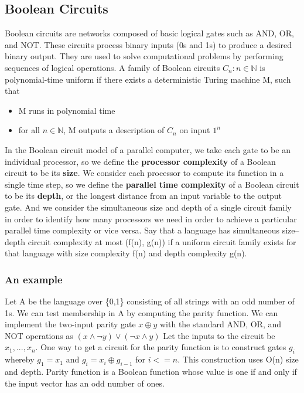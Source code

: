 \documentclass{article}
\begin{document}
\subsection{Boolean Circuits}
Boolean circuits are networks composed of basic logical gates such as AND, OR, and NOT. These circuits process binary inputs (0s and 1s) to produce a desired binary output. They are used to solve computational problems by performing sequences of logical operations.
\newline
A family of Boolean circuits $ { C_n : n  \in \mathbb{N} }$ is polynomial-time uniform if there exists a deterministic Turing machine M, such that
\begin{itemize}
\item M runs in polynomial time
\item for all $n \in \mathbb{N}$, M outputs a description of $C_n$ on input $1^n$
\end{itemize}
In the Boolean circuit model of a parallel computer, we take each gate to be an
individual processor, so we define the \textbf{processor complexity} of a Boolean circuit
to be its \textbf{size}.
\newline
We consider each processor to compute its function in a single time step, so we define the \textbf{parallel time complexity} of a Boolean circuit to be its \textbf{depth}, or the longest distance from an input variable to the output gate.
\newline And we consider the simultaneous size and depth of a single circuit family in order to identify how many processors we need in order to achieve a particular parallel time complexity
or vice versa.
\newline
Say that a language has simultaneous size–depth circuit complexity
at most (f(n), g(n)) if a uniform circuit family exists for that language with size
complexity f(n) and depth complexity g(n).
\subsubsection{An example}
Let A be the language over \{0,1\} consisting of all strings with an odd number
of 1s.
\newline
We can test membership in A by computing the parity function. We can
implement the two-input parity gate $x\oplus y$ with the standard AND, OR, and NOT
operations as $(x \land \neg y) \lor (\neg x \land y)$
Let the inputs to the circuit be $x_1,...,x_n$.
One way to get a circuit for the parity function is to construct gates $g_i$ whereby
$g_1 = x_1$ and $g_i = x_i \oplus g_{i-1}$ for $i <= n$. This construction uses O(n) size and
depth.
\newline
Parity function is a Boolean function whose value is one if and only if the input vector has an odd number of ones.
\end{document}
